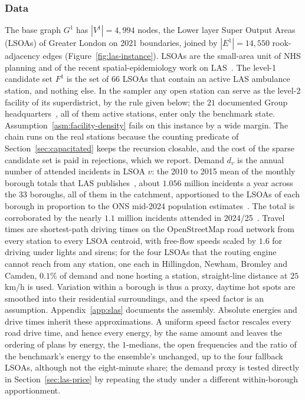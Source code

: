 \documentclass[preprint,12pt,authoryear]{elsarticle}
\theoremstyle{definition}
\begin{document}
\subsubsection{Data}\label{sec:las-data}
The base graph $G^1$ has $|V^1| = 4{,}994$ nodes, the Lower layer Super Output Areas (LSOAs) of Greater London on 2021 boundaries, joined by $|E^1| = 14{,}550$ rook-adjacency edges (Figure~\ref{fig:las-instance}). LSOAs are the small-area unit of NHS planning and of the recent spatial-epidemiology work on LAS~\citep{murphy2024socio}. The level-1 candidate set $F^1$ is the set of $66$ LSOAs that contain an active LAS ambulance station, and nothing else. In the sampler any open station can serve as the level-2 facility of its superdistrict, by the rule given below; the $21$ documented Group headquarters~\citep{las_departments2025}, all of them active stations, enter only the benchmark state. Assumption~\ref{asm:facility-density} fails on this instance by a wide margin. The chain runs on the real stations because the counting predicate of Section~\ref{sec:capacitated} keeps the recursion closable, and the cost of the sparse candidate set is paid in rejections, which we report. Demand $d_v$ is the annual number of attended incidents in LSOA $v$: the 2010 to 2015 mean of the monthly borough totals that LAS publishes~\citep{las_incidents}, about $1.056$ million incidents a year across the $33$ boroughs, all of them in the catchment, apportioned to the LSOAs of each borough in proportion to the ONS mid-2024 population estimates~\citep{ons_sape2024}. The total is corroborated by the nearly $1.1$ million incidents attended in 2024/25~\citep{las_ar_2024_25}. Travel times are shortest-path driving times on the OpenStreetMap road network from every station to every LSOA centroid, with free-flow speeds scaled by $1.6$ for driving under lights and sirens; for the four LSOAs that the routing engine cannot reach from any station, one each in Hillingdon, Newham, Bromley and Camden, $0.1\%$ of demand and none hosting a station, straight-line distance at $25$ km/h is used. Variation within a borough is thus a proxy, daytime hot spots are smoothed into their residential surroundings, and the speed factor is an assumption. Appendix~\ref{app:slas} documents the assembly. Absolute energies and drive times inherit these approximations. A uniform speed factor rescales every road drive time, and hence every energy, by the same amount and leaves the ordering of plans by energy, the $1$-medians, the open frequencies and the ratio of the benchmark's energy to the ensemble's unchanged, up to the four fallback LSOAs, although not the eight-minute share; the demand proxy is tested directly in Section~\ref{sec:las-price} by repeating the study under a different within-borough apportionment.
\end{document}
